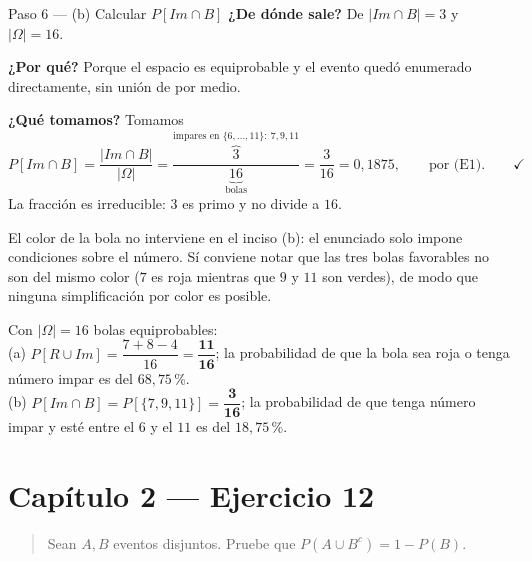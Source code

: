 \documentclass[11pt]{article}
\begin{document}
\begin{sol}
\begin{paso}{Paso 6 --- (b) Calcular $P[Im\cap B]$}
\textbf{¿De dónde sale?} De $|Im\cap B|=3$ y $|\Omega|=16$.

\textbf{¿Por qué?} Porque el espacio es equiprobable y el evento quedó enumerado directamente,
sin unión de por medio.

\textbf{¿Qué tomamos?} Tomamos
\[
P[Im\cap B]=\frac{|Im\cap B|}{|\Omega|}
=\frac{\overbrace{3}^{\text{impares en }\{6,\dots,11\}:\ 7,9,11}}{\underbrace{16}_{\text{bolas}}}
=\frac{3}{16}=0{,}1875 , \qquad\text{por (E1)} . \qquad\checkmark
\]
La fracción es irreducible: $3$ es primo y no divide a $16$.
\end{paso}

\begin{nota}
El color de la bola no interviene en el inciso (b): el enunciado solo impone condiciones sobre
el número. Sí conviene notar que las tres bolas favorables no son del mismo color ($7$ es roja
mientras que $9$ y $11$ son verdes), de modo que ninguna simplificación por color es posible.
\end{nota}

\end{sol}

\begin{resp}
Con $|\Omega|=16$ bolas equiprobables:\\[4pt]
(a) $P[R\cup Im]=\dfrac{7+8-4}{16}=\mathbf{\dfrac{11}{16}}$; la probabilidad de que la bola sea
roja o tenga número impar es del $68{,}75$\,\%.\\[4pt]
(b) $P[Im\cap B]=P[\{7,9,11\}]=\mathbf{\dfrac{3}{16}}$; la probabilidad de que tenga número impar
y esté entre el $6$ y el $11$ es del $18{,}75$\,\%.
\end{resp}

\section*{Capítulo 2 --- Ejercicio 12}

\begin{quote}
Sean $A,B$ eventos disjuntos. Pruebe que $P(A\cup B^{c})=1-P(B)$.
\end{quote}
\end{document}
